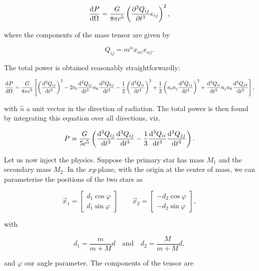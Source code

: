 \begin{equation}
    \dv{P}{\Omega} = \frac{G}{8\pi c^5}\pqty{\pdv[3]{Q_{ij}}{t}e_{ij}}^2,
\end{equation}

where the components of the mass tensor  are given by

\begin{equation}
    Q_{ij} = m^\alpha x_{\alpha i}x_{\alpha j}.
\end{equation}

The total power is obtained reasonably straightforwardly:

\begin{equation}
    \dv{P}{\Omega} = \frac{G}{8\pi c^5} \left[\pqty{\dv[3]{Q_{ij}}{t}}^2-2n_i \dv[3]{Q_{ij}}{t}n_k\dv[3]{Q_{kj}}{t}-\frac12\pqty{\dv[3]{Q_{ii}}{t}}^2+\frac12\pqty{n_i n_j\dv[3]{Q_{ij}}{t}}^2+\dv[3]{Q_{ii}}{t}n_j n_k\dv[3]{Q_{jk}}{t}\right],
\end{equation}

with $\hat{n}$ a unit vector in the direction of radiation. The total power is then found by integrating this equation over all directions, viz.

\begin{equation}
    P = \frac{G}{5c^5}\pqty{\dv[3]{Q_{ij}}{t}\dv[3]{Q_{ij}}{t}-\frac13\dv[3]{Q_{ii}}{t}\dv[3]{Q_{jj}}{t}}.
\end{equation}

Let us now inject the physics. Suppose the primary star has mass $M_1$ and the secondary mass $M_2$. In the $xy$-plane, with the origin at the center of mass, we can parameterise the positions of the two stars as

\begin{equation}
    \vec{x}_1 = \begin{bmatrix}d_1\cos\varphi \\ d_1\sin\varphi\end{bmatrix} \qquad \vec{x}_2 = \begin{bmatrix}-d_2\cos\varphi \\ -d_2\sin\varphi\end{bmatrix},
\end{equation}

with

\begin{equation}
    d_1 = \frac{m}{m+M}d\quad\text{and}\quad d_2 = \frac{M}{m+M}d,
\end{equation}

and $\varphi$ our angle parameter. The components of the tensor  are


